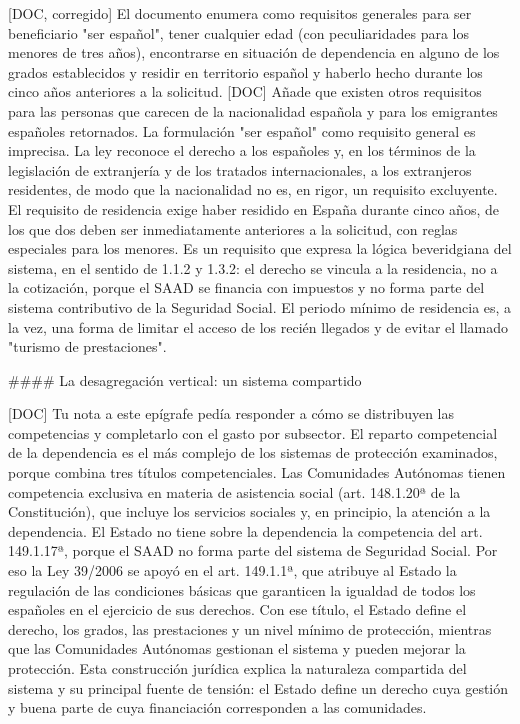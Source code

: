 \documentclass[10pt,a4paper]{article}
\begin{document}
[DOC, corregido] El documento enumera como requisitos generales para ser beneficiario "ser español", tener cualquier edad (con peculiaridades para los menores de tres años), encontrarse en situación de dependencia en alguno de los grados establecidos y residir en territorio español y haberlo hecho durante los cinco años anteriores a la solicitud. [DOC] Añade que existen otros requisitos para las personas que carecen de la nacionalidad española y para los emigrantes españoles retornados. La formulación "ser español" como requisito general es imprecisa. La ley reconoce el derecho a los españoles y, en los términos de la legislación de extranjería y de los tratados internacionales, a los extranjeros residentes, de modo que la nacionalidad no es, en rigor, un requisito excluyente. El requisito de residencia exige haber residido en España durante cinco años, de los que dos deben ser inmediatamente anteriores a la solicitud, con reglas especiales para los menores. Es un requisito que expresa la lógica beveridgiana del sistema, en el sentido de 1.1.2 y 1.3.2: el derecho se vincula a la residencia, no a la cotización, porque el SAAD se financia con impuestos y no forma parte del sistema contributivo de la Seguridad Social. El periodo mínimo de residencia es, a la vez, una forma de limitar el acceso de los recién llegados y de evitar el llamado "turismo de prestaciones".

#### La desagregación vertical: un sistema compartido

[DOC] Tu nota a este epígrafe pedía responder a cómo se distribuyen las competencias y completarlo con el gasto por subsector. El reparto competencial de la dependencia es el más complejo de los sistemas de protección examinados, porque combina tres títulos competenciales. Las Comunidades Autónomas tienen competencia exclusiva en materia de asistencia social (art. 148.1.20ª de la Constitución), que incluye los servicios sociales y, en principio, la atención a la dependencia. El Estado no tiene sobre la dependencia la competencia del art. 149.1.17ª, porque el SAAD no forma parte del sistema de Seguridad Social. Por eso la Ley 39/2006 se apoyó en el art. 149.1.1ª, que atribuye al Estado la regulación de las condiciones básicas que garanticen la igualdad de todos los españoles en el ejercicio de sus derechos. Con ese título, el Estado define el derecho, los grados, las prestaciones y un nivel mínimo de protección, mientras que las Comunidades Autónomas gestionan el sistema y pueden mejorar la protección. Esta construcción jurídica explica la naturaleza compartida del sistema y su principal fuente de tensión: el Estado define un derecho cuya gestión y buena parte de cuya financiación corresponden a las comunidades.
\end{document}
